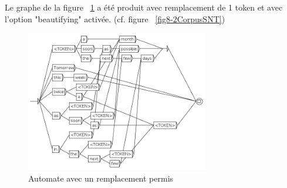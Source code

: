 Le graphe de la figure ~\ref{fig8-7GRF1replace} a été produit avec remplacement de 1 token et avec
l'option "beautifying" activée. (cf. figure ~\ref{fig8-2CorpusSNT})
\begin{figure}[!ht]
	\begin{center}
		\includegraphics[width=8cm]{resources/img/fig8-7GRF1replace.png}
		\caption{Automate avec un remplacement permis\label{fig8-7GRF1replace}}
	\end{center}
\end{figure}
